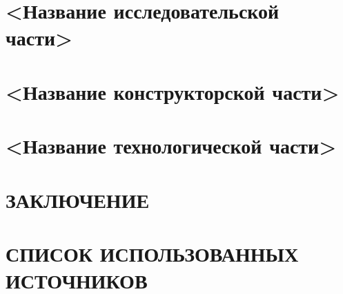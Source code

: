 \documentclass[utf8x, 14pt, oneside, a4paper]{article}
\begin{document}
		\pagebreak

	\section{<Название исследовательской части>}

		\pagebreak

	\section{<Название конструкторской части>}

		\pagebreak

	\section{<Название технологической части>}

		\pagebreak

	\section*{ЗАКЛЮЧЕНИЕ}

		\pagebreak

	\section*{СПИСОК ИСПОЛЬЗОВАННЫХ ИСТОЧНИКОВ}

		\pagebreak
\end{document}
